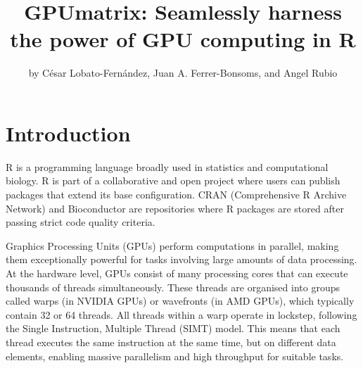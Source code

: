 \title{GPUmatrix: Seamlessly harness the power of GPU computing in R}


\author{by César Lobato-Fernández, Juan A. Ferrer-Bonsoms, and Angel Rubio}

\maketitle


\hypertarget{introduction}{%
\section{Introduction}\label{introduction}}

R\citep{R} is a programming language broadly used in statistics and computational biology. R is part of a collaborative and open project where users can publish packages that extend its base configuration. CRAN (Comprehensive R Archive Network) and Bioconductor are repositories where R packages are stored after passing strict code quality criteria.

Graphics Processing Units (GPUs) perform computations in parallel, making them exceptionally powerful for tasks involving large amounts of data processing. At the hardware level, GPUs consist of many processing cores that can execute thousands of threads simultaneously. These threads are organised into groups called warps (in NVIDIA GPUs) or wavefronts (in AMD GPUs), which typically contain 32 or 64 threads. All threads within a warp operate in lockstep, following the Single Instruction, Multiple Thread (SIMT) model. This means that each thread executes the same instruction at the same time, but on different data elements, enabling massive parallelism and high throughput for suitable tasks.

